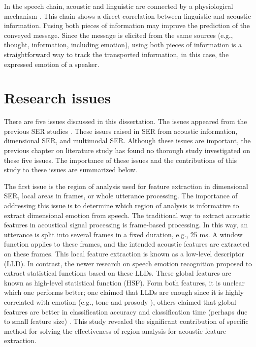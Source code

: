 
In the speech chain, acoustic and linguistic are connected by a physiological
mechanism \cite{denes1993speech}. This chain shows a direct correlation between
linguistic and acoustic information. Fusing both pieces of information may
improve the prediction of the conveyed message. Since the message is elicited
from the same sources (e.g., thought, information, including emotion), using
both pieces of information is a straightforward way to track the transported
information, in this case, the expressed emotion of a speaker.

\section{Research issues}
There are five issues discussed in this dissertation. The issues appeared from
the previous SER studies \cite{ElAyadi2011, Li2019b}. These issues raised in SER
from acoustic information, dimensional SER, and multimodal SER. Although these
issues are important, the previous chapter on literature study has found no
thorough study investigated on these five issues. The importance of these issues
and the contributions of this study to these issues are summarized below.

The first issue is the region of analysis used for feature extraction in
dimensional SER, local areas in frames, or whole utterance processing. The
importance of addressing this issue is to determine which region of analysis is
informative to extract dimensional emotion from speech. The
traditional way to extract acoustic features in acoustical signal processing is
frame-based processing. In this way, an utterance is split into several frames
in a fixed duration, e.g., 25 ms. A window function applies to these frames,
and the intended acoustic features are extracted on these frames. This local
feature extraction is known as a low-level descriptor (LLD). In contrast, the
newer research on speech emotion recognition proposed to extract statistical
functions based on these LLDs. These global features are known as high-level
statistical function (HSF). Form both features, it is unclear which one
performs better; one claimed that LLDs are enough since it is highly correlated
with emotion (e.g., tone and prosody \cite{Fritz2016}), others claimed that
global features are better in classification accuracy and classification time
(perhaps due to small feature size) \cite {ElAyadi2011}. This study revealed the
significant contribution of specific method for solving the effectiveness of
region analysis for acoustic feature extraction.


